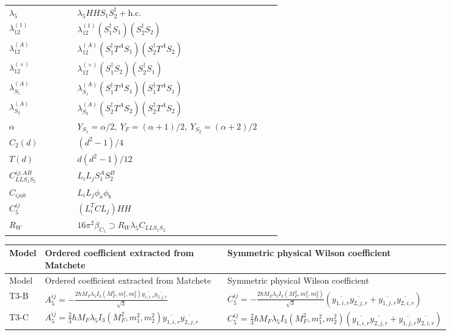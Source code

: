 \documentclass[8pt]{article}
\begin{document}
\begin{landscape}
\begin{longtable}{@{}p{0.23\linewidth}p{0.69\linewidth}@{}}
$\lambda_5$ & $\lambda_5HHS_1S_2^\dagger+\mathrm{h.c.}$ \\
$\lambda_{12}^{(1)}$ & $\lambda_{12}^{(1)}(S_1^\dagger S_1)(S_2^\dagger S_2)$ \\
$\lambda_{12}^{(A)}$ & $\lambda_{12}^{(A)}(S_1^\dagger T^AS_1)(S_2^\dagger T^AS_2)$ \\
$\lambda_{12}^{(\times)}$ & $\lambda_{12}^{(\times)}(S_1^\dagger S_2)(S_2^\dagger S_1)$ \\
$\lambda_{S_1}^{(A)}$ & $\lambda_{S_1}^{(A)}(S_1^\dagger T^A S_1)(S_1^\dagger T^A S_1)$ \\
$\lambda_{S_2}^{(A)}$ & $\lambda_{S_2}^{(A)}(S_2^\dagger T^A S_2)(S_2^\dagger T^A S_2)$ \\
$\alpha$ & $Y_{S_1}=\alpha/2,\ Y_F=(\alpha+1)/2,\ Y_{S_2}=(\alpha+2)/2$ \\
$C_2(d)$ & $(d^2-1)/4$ \\
$T(d)$ & $d(d^2-1)/12$ \\
$C_{LLS_1S_2}^{ij;AB}$ & $L_iL_jS_1^AS_2^B$ \\
$C_{ijab}$ & $L_iL_j\phi_a\phi_b$ \\
$C_5^{ij}$ & $(L_i^TCL_j)HH$ \\
$R_W$ & $16\pi^2\beta_{C_5}\supset R_W\lambda_5C_{LLS_1S_2}$ \\
\bottomrule
\end{longtable}
\scriptsize
\begin{longtable}{@{}l >{\raggedright\arraybackslash}p{0.42\linewidth} >{\raggedright\arraybackslash}p{0.42\linewidth}@{}}
\toprule
Model & Ordered coefficient extracted from Matchete & Symmetric physical Wilson coefficient \\
\midrule
\endfirsthead
\toprule
Model & Ordered coefficient extracted from Matchete & Symmetric physical Wilson coefficient \\
\midrule
\endhead
T3-B & \(\displaystyle A_5^{ij}=-\frac{2 \hbar  M_F \lambda_5 I_3\left(M_F^2,m_1^2,m_2^2\right) \overline{y_{1,i,r}} \overline{y_{2,j,r}}}{\sqrt{3}}\) & \(\displaystyle C_5^{ij}=-\frac{2 \hbar  M_F \lambda_5 I_3\left(M_F^2,m_1^2,m_2^2\right) }{\sqrt{3}}\left(\overline{y_{1,i,r}} \overline{y_{2,j,r}}+\overline{y_{1,j,r}} \overline{y_{2,i,r}}\right)\) \\
\midrule
T3-C & \(\displaystyle A_5^{ij}=\frac{2}{3} \hbar  M_F \lambda_5 I_3\left(M_F^2,m_1^2,m_2^2\right) \overline{y_{1,i,r}} \overline{y_{2,j,r}}\) & \(\displaystyle C_5^{ij}=\frac{2}{3} \hbar  M_F \lambda_5 I_3\left(M_F^2,m_1^2,m_2^2\right)\left(\overline{y_{1,i,r}} \overline{y_{2,j,r}}+\overline{y_{1,j,r}} \overline{y_{2,i,r}}\right)\) \\

\end{longtable}
\end{landscape}
\end{document}
